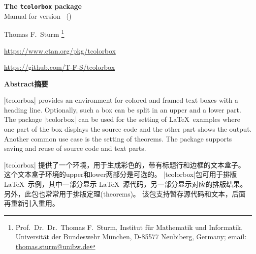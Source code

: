 \tcbuselistingtext


\clearpage
\begin{center}
\begin{tcolorbox}[enhanced,hbox,tikznode,left=8mm,right=8mm,boxrule=0.4pt,
  colback=white,colframe=black!50!yellow,
  drop lifted shadow=black!50!yellow,arc is angular,
  before=\par\vspace*{5mm},after=\par\bigskip]
{\bfseries\LARGE The \texttt{tcolorbox} package}\\[3mm]
{\large Manual for version \version\ (\datum)}
\end{tcolorbox}
{\large Thomas F.~Sturm%
  \footnote{Prof.~Dr.~Dr.~Thomas F.~Sturm, Institut f\"{u}r Mathematik und Informatik,
    Universit\"{a}t der Bundeswehr M\"{u}nchen, D-85577 Neubiberg, Germany;
     email: \href{mailto:thomas.sturm@unibw.de}{thomas.sturm@unibw.de}}\par\medskip
\normalsize\url{https://www.ctan.org/pkg/tcolorbox}\par
\url{https://github.com/T-F-S/tcolorbox}}
\end{center}
\bigskip
\begin{absquote}
  \begin{center}\bfseries Abstract摘要\end{center}


|tcolorbox| provides an environment for colored and framed text boxes with a
heading line. Optionally, such a box can be split in an upper and a lower
part. The package |tcolorbox| can be used for the setting of \LaTeX\ examples where
one part of the box displays the source code and the other part shows the
output. Another common use case is the setting of theorems. The package supports
saving and reuse of source code and text parts.





|tcolorbox| 提供了一个环境，用于生成彩色的，带有标题行和边框的文本盒子。%
这个文本盒子环境的upper和lower两部分是可选的。
|tcolorbox|包可用于排版 \LaTeX\ 示例，其中一部分显示 \LaTeX\ 源代码，另一部分显示对应的排版结果。
另外，此包也常常用于排版定理(theorems)。%
该包支持暂存源代码和文本，后面再重新引入重用。

\end{absquote}



